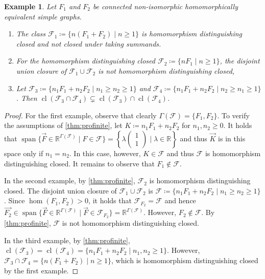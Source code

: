 \documentclass[3p,final]{elsarticle}
\DeclareMathOperator{\spn}{span}
\DeclareMathOperator{\cl}{cl}
\newtheorem{example}[theorem]{Example}
\begin{document}
	\begin{example} \label{ex1} \label{ex:union}
		Let $F_1$ and $F_2$ be connected non-isomorphic homomorphically equivalent simple graphs.
		\begin{enumerate}
			\item The class $\mathcal{F}_1 \coloneqq \{n(F_1 + F_2) \mid n \geq 1\}$ is homomorphism distinguishing closed and not closed under taking summands.
			\item For the homomorphism distinguishing closed $\mathcal{F}_2 \coloneqq \{n F_1 \mid n \geq 1\}$, 
			the disjoint union closure of  $\mathcal{F}_1 \cup \mathcal{F}_2$ is not homomorphism distinguishing closed,
			\item Let $\mathcal{F}_3 \coloneqq \{n_1F_1 + n_2F_2 \mid n_1 \geq n_2 \geq 1\}$ and $\mathcal{F}_4 \coloneqq \{n_1F_1 + n_2F_2 \mid n_2 \geq n_1 \geq 1\}$.
			Then $\cl(\mathcal{F}_3 \cap \mathcal{F}_4) \subsetneq \cl(\mathcal{F}_3) \cap \cl(\mathcal{F}_4)$.
		\end{enumerate}
	\end{example}
	\begin{proof}%
		For the first example, observe that clearly $\Gamma(\mathcal{F}) = \{F_1, F_2\}$.
		To verify the assumptions of \cref{thm:profinite}, let $K \coloneqq n_1 F_1 + n_2 F_2$ for $n_1, n_2 \geq 0$. 
		It holds that $\spn\{\vec{F} \in \mathbb{R}^{\Gamma(\mathcal{F})} \mid F \in \mathcal{F}\} = \left\{ \lambda \left( \begin{smallmatrix}
			1\\1
		\end{smallmatrix} \right) \mid \lambda \in \mathbb{R} \right\}$ and thus $\vec{K}$ is in this space only if $n_1 = n_2$. In this case, however, $K \in \mathcal{F}$ and thus $\mathcal{F}$ is homomorphism distinguishing closed. It remains to observe that $F_1 \not\in \mathcal{F}$.
		
		In the second example, by \cref{thm:profinite}, $\mathcal{F}_2$ is homomorphism distinguishing closed. 
		The disjoint union closure of $\mathcal{F}_1 \cup \mathcal{F}_2$ is $\mathcal{F} \coloneqq \{n_1 F_1 + n_2 F_2 \mid n_1 \geq n_2 \geq 1\}$.
		Since $\hom(F_1, F_2) > 0$, it holds that $\mathcal{F}_{F_2} = \mathcal{F}$ and hence $\vec{F_2} \in \spn\{\vec{F} \in \mathbb{R}^{\Gamma(\mathcal{F})} \mid \vec{F} \in \mathcal{F}_{F_2}\} = \mathbb{R}^{\Gamma(\mathcal{F})}$. However, $F_2 \not\in \mathcal{F}$. By \cref{thm:profinite}, $\mathcal{F}$ is not homomorphism distinguishing closed.
		
		In the third example, by \cref{thm:profinite}, $\cl(\mathcal{F}_3) = \cl(\mathcal{F}_4) = \{n_1F_1 + n_2F_2 \mid n_1, n_2 \geq 1\}$.
		However, $\mathcal{F}_3 \cap \mathcal{F}_4 = \{n(F_1 + F_2) \mid n \geq 1\}$, which is homomorphism distinguishing closed by the first example.
	\end{proof}
\end{document}
